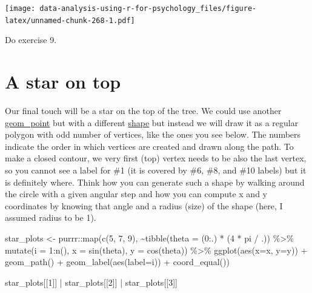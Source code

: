 \documentclass[
]{book}
\newenvironment{Shaded}{\begin{snugshade}}{\end{snugshade}}
\newcommand{\AttributeTok}[1]{\textcolor[rgb]{0.77,0.63,0.00}{#1}}
\newcommand{\DecValTok}[1]{\textcolor[rgb]{0.00,0.00,0.81}{#1}}
\newcommand{\FunctionTok}[1]{\textcolor[rgb]{0.00,0.00,0.00}{#1}}
\newcommand{\NormalTok}[1]{#1}
\newcommand{\OtherTok}[1]{\textcolor[rgb]{0.56,0.35,0.01}{#1}}
\newcommand{\SpecialCharTok}[1]{\textcolor[rgb]{0.00,0.00,0.00}{#1}}
\begin{document}
\texttt{[image: data-analysis-using-r-for-psychology\_files/figure-latex/unnamed-chunk-268-1.pdf]}

Do exercise 9.

\hypertarget{a-star-on-top}{%
\section{A star on top}\label{a-star-on-top}}

Our final touch will be a star on the top of the tree. We could use another \href{https://ggplot2.tidyverse.org/reference/geom_point.html}{geom\_point} but with a different \href{https://ggplot2.tidyverse.org/articles/ggplot2-specs.html\#sec:shape-spec}{shape} but instead we will draw it as a regular polygon with odd number of vertices, like the ones you see below. The numbers indicate the order in which vertices are created and drawn along the path. To make a closed contour, we very first (top) vertex needs to be also the last vertex, so you cannot see a label for \#1 (it is covered by \#6, \#8, and \#10 labels) but it is definitely where. Think how you can generate such a shape by walking around the circle with a given angular step and how you can compute x and y coordinates by knowing that angle and a radius (size) of the shape (here, I assumed radius to be 1).

\begin{Shaded}
\begin{Highlighting}[]
\NormalTok{star\_plots }\OtherTok{\textless{}{-}}\NormalTok{ purrr}\SpecialCharTok{::}\FunctionTok{map}\NormalTok{(}\FunctionTok{c}\NormalTok{(}\DecValTok{5}\NormalTok{, }\DecValTok{7}\NormalTok{, }\DecValTok{9}\NormalTok{),}
                         \SpecialCharTok{\textasciitilde{}}\FunctionTok{tibble}\NormalTok{(}\AttributeTok{theta =}\NormalTok{ (}\DecValTok{0}\SpecialCharTok{:}\NormalTok{.) }\SpecialCharTok{*}\NormalTok{ (}\DecValTok{4} \SpecialCharTok{*}\NormalTok{ pi }\SpecialCharTok{/}\NormalTok{ .)) }\SpecialCharTok{\%\textgreater{}\%}
                          \FunctionTok{mutate}\NormalTok{(}\AttributeTok{i =} \DecValTok{1}\SpecialCharTok{:}\FunctionTok{n}\NormalTok{(),}
                                 \AttributeTok{x =} \FunctionTok{sin}\NormalTok{(theta),}
                                 \AttributeTok{y =} \FunctionTok{cos}\NormalTok{(theta)) }\SpecialCharTok{\%\textgreater{}\%}
                          \FunctionTok{ggplot}\NormalTok{(}\FunctionTok{aes}\NormalTok{(}\AttributeTok{x=}\NormalTok{x, }\AttributeTok{y=}\NormalTok{y)) }\SpecialCharTok{+} 
                          \FunctionTok{geom\_path}\NormalTok{() }\SpecialCharTok{+}
                          \FunctionTok{geom\_label}\NormalTok{(}\FunctionTok{aes}\NormalTok{(}\AttributeTok{label=}\NormalTok{i)) }\SpecialCharTok{+}
                          \FunctionTok{coord\_equal}\NormalTok{())}

                      
\NormalTok{star\_plots[[}\DecValTok{1}\NormalTok{]] }\SpecialCharTok{|}\NormalTok{ star\_plots[[}\DecValTok{2}\NormalTok{]] }\SpecialCharTok{|}\NormalTok{ star\_plots[[}\DecValTok{3}\NormalTok{]]}
\end{Highlighting}
\end{Shaded}
\end{document}
